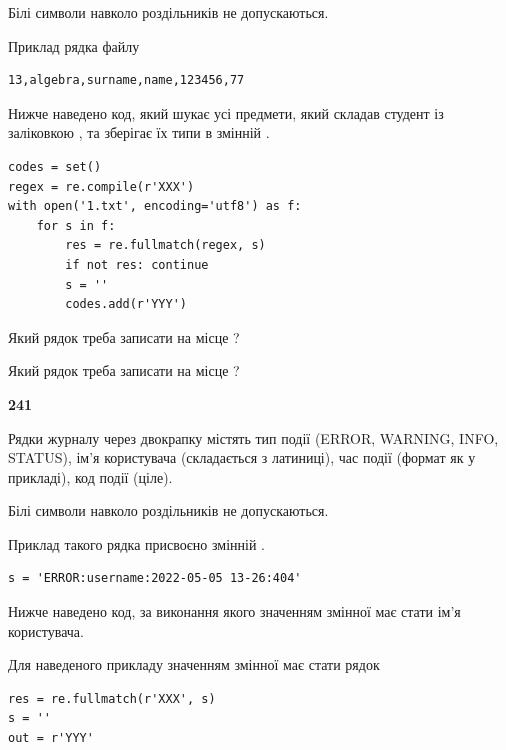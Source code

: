Білі символи навколо роздільників не допускаються.

Приклад рядка файлу



\begin{verbatim}
13,algebra,surname,name,123456,77
\end{verbatim}


Нижче наведено код, який шукає усі предмети, який складав студент із заліковкою , та зберігає їх типи в змінній .



\begin{verbatim}
codes = set()
regex = re.compile(r'XXX')
with open('1.txt', encoding='utf8') as f:
    for s in f:
        res = re.fullmatch(regex, s)
        if not res: continue
        s = ''
        codes.add(r'YYY')
\end{verbatim}





Який рядок треба записати на місце  ?\par
\vspace{5mm}


Який рядок треба записати на місце  ?\par


\newpage

{\begin {center}\textbf{ 241}\end {center}}\par
Рядки журналу через двокрапку містять тип події (ERROR, WARNING, INFO, STATUS), ім'я користувача (складається з латиниці), час події (фор\-мат як у прикладі), код події (ціле).

Білі символи навколо роздільників не допускаються.

Приклад такого рядка присвоєно змінній .



\begin{verbatim}
s = 'ERROR:username:2022-05-05 13-26:404'
\end{verbatim}


Нижче наведено код, за виконання якого значенням змінної  має стати ім'я користувача.

Для наведеного прикладу значенням змінної  має стати рядок 



\begin{verbatim}
res = re.fullmatch(r'XXX', s)
s = ''
out = r'YYY'
\end{verbatim}


